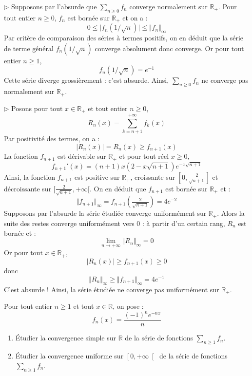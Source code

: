\documentclass[a4paper,twoside,french,11pt]{VcCours}
\newcommand{\Sum}[2]{\sum_{#1}^{#2}}
\begin{document}
\medskip

$\rhd$ Supposons par l'absurde que $\Sum{n\geq 0}{} f_n$ converge normalement sur $\mathbb{R}_+$. Pour tout entier $n \geq 0$, $f_n$ est bornée sur $\mathbb{R}_+$ et on a :
$$ 0 \leq \vert f_n(1/\sqrt{n}) \vert \leq \Vert f_n \Vert_{\infty}$$
Par critère de comparaison des séries à termes positifs, on en déduit que la série de terme général $f_n(1/\sqrt{n})$ converge absolument donc converge. Or pour tout entier $n \geq 1$,
 $$ f_n(1/\sqrt{n}) = e^{-1}$$
Cette série diverge grossièrement : c'est absurde. Ainsi, $\Sum{n\geq 0}{} f_n$ ne converge pas normalement sur $\mathbb{R}_+$.

\medskip

$\rhd$ Posons pour tout $x \in \mathbb{R}_+$ et tout entier $n \geq 0$,
$$ R_n(x) = \sum_{k=n+1}^{+ \infty} f_k(x)$$
Par positivité des termes, on a :
$$ \vert R_n(x) \vert = R_n(x) \geq f_{n+1}(x)$$
La fonction $f_{n+1}$ est dérivable sur $\mathbb{R}_+$ et pour tout réel $x \geq 0$,
$$ f_{n+1}'(x) = (n+1)x (2-x \sqrt{n+1})e^{-x \sqrt{n+1}}$$
Ainsi, la fonction $f_{n+1}$ est positive sur $\mathbb{R}_+$, croissante sur $[0, \tfrac2{\sqrt{n+1}}]$ et décroissante sur $[\tfrac2{\sqrt{n+1}}, + \infty[$. On en déduit que $f_{n+1}$ est bornée sur $\mathbb{R}_+$ et :
$$ \Vert f_{n+1} \Vert_{\infty} = f_{n+1}(\tfrac2{\sqrt{n+1}}) = 4 e^{-2}$$
Supposons par l'absurde la série étudiée converge uniformément sur $\mathbb{R}_+$. Alors la suite des restes converge uniformément vers $0$ : à partir d'un certain rang, $R_n$ est bornée et :
$$ \lim_{n \rightarrow + \infty} \Vert R_n \Vert_{ \infty} = 0$$
Or pour tout $x \in \mathbb{R}_+$,
$$  \vert R_n(x) \vert \geq f_{n+1}(x) \geq 0$$
donc 
$$ \Vert R_n \Vert_{\infty} \geq \Vert f_{n+1} \Vert_{\infty} = 4 e^{-1}$$
C'est absurde ! Ainsi, la série étudiée ne converge pas uniformément sur $\mathbb{R}_+$.


\begin{Exercice}{} Pour tout entier $n \geq 1$ et tout $x \in \mathbb{R}$, on pose :
$$ f_n(x) = \dfrac{\left(-1\right)^{n}e^{-nx}}{n} $$

\begin{enumerate}
\item Étudier la convergence simple sur $\mathbb{R}$  de la série de fonctions $\Sum{n\geq 1}{} f_n.$
\item Étudier la convergence uniforme sur $\left[ 0,+\infty\right[ $  de la série de fonctions $\Sum{n\geq 1}{} f_n.$
\end{enumerate}
\end{Exercice}
\end{document}
